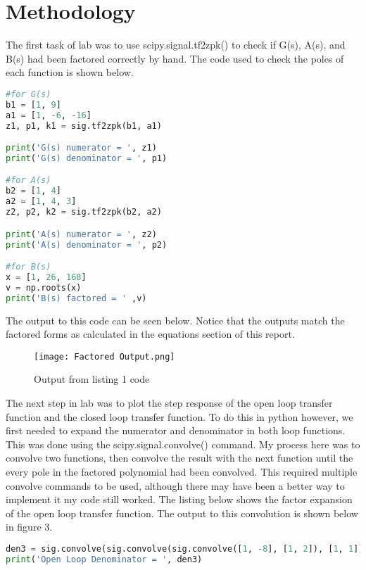 \documentclass[12pt]{report}
\begin{document}
\section{Methodology}
\hspace{\parindent}The first task of lab was to use scipy.signal.tf2zpk() to check if G(s), A(s), and B(s) had been factored correctly by hand. The code used to check the poles of each function is shown below.
\begin{lstlisting}[language=Python, caption=Code for factoring polynomials]
#for G(s)
b1 = [1, 9]
a1 = [1, -6, -16]
z1, p1, k1 = sig.tf2zpk(b1, a1)

print('G(s) numerator = ', z1)
print('G(s) denominator = ', p1)

#for A(s)
b2 = [1, 4]
a2 = [1, 4, 3]
z2, p2, k2 = sig.tf2zpk(b2, a2)

print('A(s) numerator = ', z2)
print('A(s) denominator = ', p2)

#for B(s)
x = [1, 26, 168]
v = np.roots(x)
print('B(s) factored = ' ,v)
\end{lstlisting}
\hspace{\parindent}The output to this code can be seen below. Notice that the outputs match the factored forms as calculated in the equations section of this report.\\
\begin{figure}[h!]
    \centering
    \texttt{[image: Factored Output.png]}
    \caption{Output from listing 1 code}
    \label{Figure x:}
\end{figure}
\hspace{\parindent}The next step in lab was to plot the step response of the open loop transfer function and the closed loop transfer function. To do this in python however, we first needed to expand the numerator and denominator in both loop functions. This was done using the scipy.signal.convolve() command. My process here was to convolve two functions, then convolve the result with the next function until the every pole in the factored polynomial had been convolved. This required multiple convolve commands to be used, although there may have been a better way to implement it my code still worked. The listing below shows the factor expansion of the open loop transfer function. The output to this convolution is shown below in figure 3.
\begin{lstlisting}[language=Python, caption=Open loop convolution code]
den3 = sig.convolve(sig.convolve(sig.convolve([1, -8], [1, 2]), [1, 1]), [1, 3])
print('Open Loop Denominator = ', den3)
\end{lstlisting}
\end{document}
